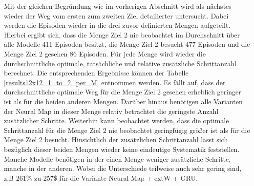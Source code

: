 Mit der gleichen Begründung wie im vorherigen Abschnitt wird als nächstes wieder der Weg vom ersten zum zweiten Ziel detailierter untersucht. Dabei werden die Episoden wieder in die drei zuvor definierten Mengen aufgeteilt. Hierbei ergibt sich, dass die Menge \glqq Ziel 2 nie beobachtet\grqq{} im Durchschnitt über alle Modelle 411 Episoden besitzt, die Menge \glqq Ziel 2 besucht\grqq{} 477 Episoden und die Menge \glqq Ziel 2 gesehen\grqq{} 86 Episoden. Für jede Menge wird wieder die durchschnittliche optimale, tatsächliche und relative zusätzliche Schrittanzahl berechnet. Die entsprechenden Ergebnisse können der Tabelle \ref{results12x12_1_to_2_per_M} entnommen werden. Es fällt auf, dass der durchschnittliche optimale Weg für die Menge \glqq Ziel 2 gesehen\grqq{} erheblich geringer ist als für die beiden anderen Mengen. Darüber hinaus benötigen alle Varianten der Neural Map in dieser Menge relativ betrachtet die geringste Anzahl zusätzlicher Schritte. Weiterhin kann beobachtet werden, dass die optimale Schrittanzahl für die Menge \glqq Ziel 2 nie beobachtet\grqq{} geringfügig größer ist als für die Menge \glqq Ziel 2 besucht\grqq{}. Hinsichtlich der zusätzlichen Schrittanzahl lässt sich bezüglich dieser beiden Mengen wieder keine eindeutige Systematik feststellen. Manche Modelle benötigen in der einen Menge weniger zusätzliche Schritte, manche in der anderen. Wobei die Unterschiede teilweise auch sehr gering sind, z.B 261\% zu 257\$ für die Variante Neural Map + extW + GRU.

